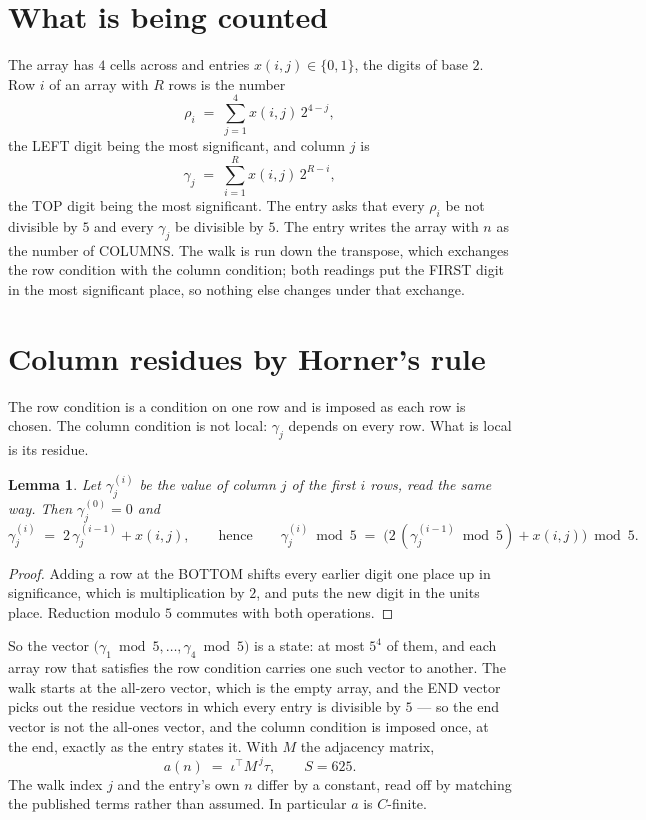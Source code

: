 \documentclass[11pt,a4paper]{article}
\theoremstyle{plain}
\newtheorem{lemma}[theorem]{Lemma}
\theoremstyle{definition}
\begin{document}
\section{What is being counted}

The array has $4$ cells across and entries $x(i,j)\in\{0,1\}$, the digits of
base $2$. Row $i$ of an array with $R$ rows is the number
\[
\rho_i\;=\;\sum_{j=1}^{4}x(i,j)\,2^{4-j} ,
\]
the LEFT digit being the most significant, and column $j$ is
\[
\gamma_j\;=\;\sum_{i=1}^{R}x(i,j)\,2^{R-i} ,
\]
the TOP digit being the most significant. The entry asks that every $\rho_i$ be not divisible by
$5$ and every $\gamma_j$ be divisible by $5$. The entry writes the array with $n$ as the number of COLUMNS. The walk is run down the transpose, which exchanges the row condition with the column condition; both readings put the FIRST digit in the most significant place, so nothing else changes under that exchange.


\section{Column residues by Horner's rule}

The row condition is a condition on one row and is imposed as each row is chosen. The column
condition is not local: $\gamma_j$ depends on every row. What is local is its residue.

\begin{lemma}\label{lem:horner}
Let $\gamma_j^{(i)}$ be the value of column $j$ of the first $i$ rows, read the same way.
Then $\gamma_j^{(0)}=0$ and
\[
\gamma_j^{(i)}\;=\;2\,\gamma_j^{(i-1)}+x(i,j),
\qquad\text{hence}\qquad
\gamma_j^{(i)}\bmod 5\;=\;
\bigl(2\,(\gamma_j^{(i-1)}\bmod 5)+x(i,j)\bigr)\bmod 5 .
\]
\end{lemma}

\begin{proof}
Adding a row at the BOTTOM shifts every earlier digit one place up in significance, which is
multiplication by $2$, and puts the new digit in the units place. Reduction modulo
$5$ commutes with both operations.
\end{proof}

So the vector $\bigl(\gamma_1\bmod 5,\dots,\gamma_{4}\bmod
5\bigr)$ is a state: at most $5^{4}$ of them, and each array row
that satisfies the row condition carries one such vector to another. The walk starts at the
all-zero vector, which is the empty array, and the END vector picks out the residue vectors in
which every entry is divisible by $5$ --- so the end vector is not the all-ones
vector, and the column condition is imposed once, at the end, exactly as the entry states it.
With $M$ the adjacency matrix,
\[
a(n)\;=\;\iota^{\!\top}M^{\,j}\tau ,\qquad S=625.
\]
The walk index $j$ and the entry's own $n$ differ by a constant, read off by matching the
published terms rather than assumed. In particular $a$ is $C$-finite.
\end{document}
